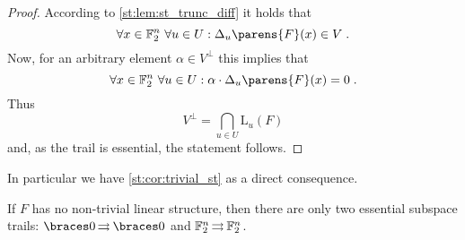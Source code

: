 \begin{proof}
    According to \cref{st:lem:st_trunc_diff} it holds that
    \begin{equation*}
        \forall x \in \F_2^n \ \forall u \in U: \Delta_{u}\parens{F}(x) \in V\;.
    \end{equation*}
    Now, for an arbitrary element $\alpha \in V^{\perp}$ this implies that
    \begin{equation*}
        \forall x \in \F_2^n \ \forall u \in U: \iprod{\alpha}{\Delta_{u}\parens{F}(x)} = 0\;.
    \end{equation*}
    Thus
    \begin{equation*}
        V^\perp = \bigcap_{u \in U} \mathrm{L}_{u}(F)
    \end{equation*}
    and, as the trail is essential, the statement follows.
\end{proof}

In particular we have \cref{st:cor:trivial_st} as a direct consequence.
\begin{corollary}\label{st:cor:trivial_st}
    If $F$ has no non-trivial linear structure, then there are only two essential subspace trails: $\propDiff{\set{0}}{}{}{\set{0}}$ and $\mathbb{F}_2^n \operatorname*{\rightrightarrows}^{}_{} \mathbb{F}_2^n$.
\end{corollary}

